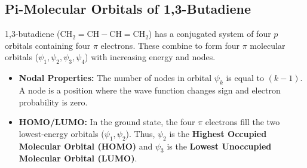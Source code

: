 \documentclass[12pt,a4paper]{article}
\begin{document}
\subsection{Pi-Molecular Orbitals of 1,3-Butadiene}
1,3-butadiene ($\mathrm{CH_2=CH-CH=CH_2}$) has a conjugated system of four $p$ orbitals containing four $\pi$ electrons. These combine to form four $\pi$ molecular orbitals ($\psi_1, \psi_2, \psi_3, \psi_4$) with increasing energy and nodes.
\begin{itemize}[leftmargin=*, itemsep=3pt]
  \item \textbf{Nodal Properties:} The number of nodes in orbital $\psi_k$ is equal to $(k-1)$. A node is a position where the wave function changes sign and electron probability is zero.
  \item \textbf{HOMO/LUMO:} In the ground state, the four $\pi$ electrons fill the two lowest-energy orbitals ($\psi_1, \psi_2$). Thus, $\psi_2$ is the \textbf{Highest Occupied Molecular Orbital (HOMO)} and $\psi_3$ is the \textbf{Lowest Unoccupied Molecular Orbital (LUMO)}.
\end{itemize}
\end{document}
